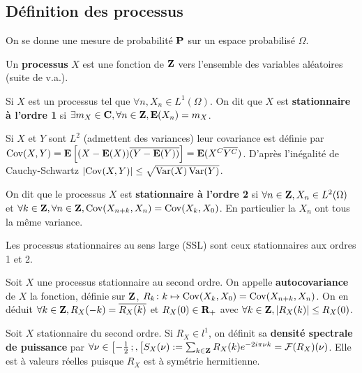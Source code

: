 \subsection{Définition des processus}

	On se donne une mesure de probabilité $\mathbf{P}$ sur un espace probabilisé $\Omega$.
	
	\begin{defn}
		Un \textbf{processus} $X$ est une fonction de $\mathbf{Z}$ vers l'ensemble des variables aléatoires (suite de v.a.).
	\end{defn}
	
	\begin{defn}
		Si $X$ est un processus tel que $\forall n, X_n \in L^1(\Omega)$.
		On dit que $X$ est \textbf{stationnaire à l'ordre 1} si $\exists m_X \in \mathbf{C}, \forall n \in \mathbf{Z}, \mathbf{E}(X_n) = m_X$.
	\end{defn}
	
	\begin{defn}
		Si $X$ et $Y$ sont $L^2$ (admettent des variances) leur covariance est définie par
		$\operatorname{Cov}(X,Y) = \mathbf{E} \left[ (X - \mathbf{E}(X)) \overline{(Y - \mathbf{E}(Y))} \right] = \mathbf{E}(X^C \overline{Y^C})$.
		D'après l'inégalité de Cauchy-Schwartz $\left\lvert\operatorname{Cov}(X,Y)\right\rvert \leq \sqrt{\operatorname{Var}(X) \operatorname{Var}(Y)}$.
	\end{defn}
	
	\begin{defn}
		On dit que le processus $X$ est \textbf{stationnaire à l'ordre 2} si $\forall n \in \mathbf{Z}, X_n \in L^2(\Omega)$ et
		$\forall k \in \mathbf{Z}, \forall n \in \mathbf{Z}, \operatorname{Cov}(X_{n + k},X_n) = \operatorname{Cov}(X_k,X_0)$.
		En particulier la $X_n$ ont tous la même variance.
	\end{defn}
	
	\begin{defn}
		Les processus stationnaires au sens large (SSL) sont ceux stationnaires aux ordres 1 et 2.
	\end{defn}
	
	\begin{defn}
		Soit $X$ une processus stationnaire au second ordre.
		On appelle \textbf{autocovariance} de $X$ la fonction, définie sur $\mathbf{Z}$, $R_k \colon k \mapsto \operatorname{Cov}(X_k,X_0) = \operatorname{Cov}(X_{n + k},X_n)$.
		On en déduit $\forall k \in \mathbf{Z}, R_X(-k) = \overline{R_X(k)}$ et $R_X(0) \in \mathbf{R}_+$ avec
		$\forall k \in \mathbf{Z}, \left\lvert R_X(k)\right\rvert \leq R_X(0)$.
	\end{defn}
	
	\begin{defn}
		Soit $X$ stationnaire du second ordre.
		Si $R_X \in l^1$, on définit sa \textbf{densité spectrale de puissance} par $\forall \nu \in \mathopen{}\mathclose{\left[-\frac{1}{2}\mathclose{}\mathpunct{};,\right[} S_X(\nu) := \sum_{k \in \mathbf{Z}} R_X(k) e^{-2i\pi \nu k} = \mathcal{F}(R_X)(\nu)$.
		Elle est à valeurs réelles puisque $R_X$ est à symétrie hermitienne.
	\end{defn}
	
